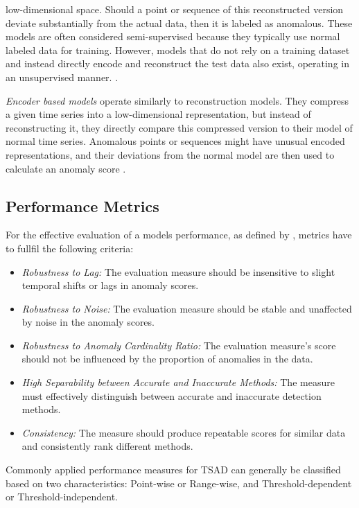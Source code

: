 \documentclass[12pt,oneside]{article}
\begin{document}
low-dimensional space. Should a point or sequence of this reconstructed version deviate substantially from the actual data, then it is labeled as anomalous. These models are often considered semi-supervised because they typically use normal labeled data for training. However, models that do not rely on a training dataset and instead directly encode and reconstruct the test data also exist, operating in an unsupervised manner. \parencites[p.~5]{SchmidlEtAl2022Anomaly}. \par \textit{Encoder based models} operate similarly to reconstruction models. They compress a given time series into a low-dimensional representation, but instead of reconstructing it, they directly compare this compressed version to their model of normal time series. Anomalous points or sequences might have unusual encoded representations, and their deviations from the normal model are then used to calculate an anomaly score \parencites[p.~5-6]{SchmidlEtAl2022Anomaly}.

\subsection{Performance Metrics}

For the effective evaluation of a models performance, as defined by \cite{papaVus}, metrics have to fullfil the following criteria:
\begin{itemize}
    \item \textit{Robustness to Lag:} The evaluation measure should be insensitive to slight temporal shifts or lags in anomaly scores.
    \item \textit{Robustness to Noise:} The evaluation measure should be stable and unaffected by noise in the anomaly scores.
    \item \textit{Robustness to Anomaly Cardinality Ratio:} The evaluation measure's score should not be influenced by the proportion of anomalies in the data.
    \item \textit{High Separability between Accurate and Inaccurate Methods:} The measure must effectively distinguish between accurate and inaccurate detection methods.
    \item \textit{Consistency:} The measure should produce repeatable scores for similar data and consistently rank different methods.
\end{itemize}
Commonly applied performance measures for TSAD can generally be classified based on two characteristics: Point-wise or Range-wise, and Threshold-dependent or Threshold-independent.
\end{document}
